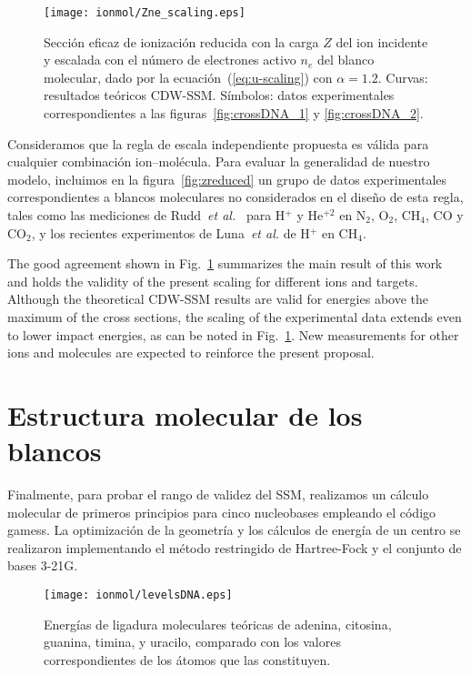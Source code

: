 \begin{figure}
\centering
\texttt{[image: ionmol/Zne\_scaling.eps]}
\caption[Sección eficaz de ionización reducida por $Z$ y $n_e$.]
{Sección eficaz de ionización reducida con la carga $Z$ del ion incidente
y escalada con el número de electrones activo $n_e$ del blanco molecular,
dado por la ecuación~(\ref{eq:u-scaling}) con $\alpha=1.2$. 
Curvas: resultados teóricos CDW-SSM. 
Símbolos: datos experimentales correspondientes a las 
figuras~\ref{fig:crossDNA_1} y \ref{fig:crossDNA_2}.}
\label{fig:zalpha}
\end{figure} 

Consideramos que la regla de escala independiente propuesta es válida 
para cualquier combinación ion--molécula. Para evaluar la generalidad 
de nuestro modelo, incluimos en la figura~\ref{fig:zreduced} un grupo 
de datos experimentales correspondientes a blancos moleculares no 
considerados en el diseño de esta regla, tales como las mediciones de
Rudd~\textit{et al.}~\cite{Rudd:85,Rudd:83} para H$^{+}$ y He$^{+2}$ 
en N$_2$, O$_2$, CH$_4$, CO y CO$_2$, y los recientes experimentos de
Luna~\textit{et al.} \cite{Luna2019} de H$^{+}$ en CH$_4$. 

The good agreement shown in Fig.~\ref{fig:zalpha} summarizes the main 
result of this work and holds the validity of the present scaling for 
different ions and targets. Although the theoretical CDW-SSM results 
are valid for energies above the maximum of the cross sections, the 
scaling of the experimental data extends even to lower impact energies, 
as can be noted in Fig.~\ref{fig:zalpha}. New measurements for other 
ions and molecules are expected to reinforce the present proposal. 

\section{Estructura molecular de los blancos}
\label{sec:molcalculations}

Finalmente, para probar el rango de validez del SSM, realizamos un 
cálculo molecular de primeros principios para cinco nucleobases 
empleando el código {\sc gamess}. La optimización de la geometría y los 
cálculos de energía de un centro se realizaron implementando el método
restringido de Hartree-Fock y el conjunto de bases 3-21G. 

\begin{figure}
\centering
\texttt{[image: ionmol/levelsDNA.eps]}
\caption[Energías de ligadura moleculares teóricas de ADN y ARN.]
{Energías de ligadura moleculares teóricas de adenina, citosina, guanina, 
timina, y uracilo, comparado con los valores correspondientes de los 
átomos que las constituyen.}
\label{fig:bindener}
\end{figure}

